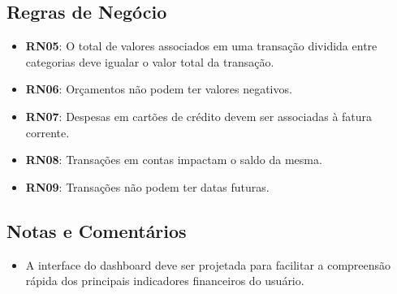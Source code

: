 \subsection*{Regras de Negócio}
\begin{addmargin}[1.5cm]{0cm}
    \begin{itemize}
        \item \textbf{RN05}: O total de valores associados em uma transação dividida entre categorias deve igualar o valor total da transação.
        \item \textbf{RN06}: Orçamentos não podem ter valores negativos.
        \item \textbf{RN07}: Despesas em cartões de crédito devem ser associadas à fatura corrente.
        \item \textbf{RN08}: Transações em contas impactam o saldo da mesma.
        \item \textbf{RN09}: Transações não podem ter datas futuras.
    \end{itemize}
\end{addmargin}

\subsection*{Notas e Comentários}
\begin{addmargin}[1.5cm]{0cm}
    \begin{itemize}
        \item A interface do dashboard deve ser projetada para facilitar a compreensão rápida dos principais indicadores financeiros do usuário.
    \end{itemize}
\end{addmargin}

